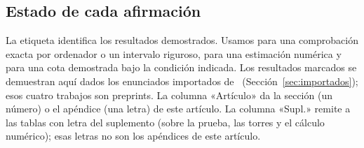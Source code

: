 \subsection{Estado de cada afirmación}\label{sec:claim-ledger}
La etiqueta  identifica los resultados demostrados.
Usamos  para una comprobación exacta por ordenador o un intervalo riguroso,
 para una estimación numérica y  para una cota demostrada bajo la
condición indicada. Los resultados marcados  se demuestran aquí dados los
enunciados importados de~\cite{pv,ef,pc,tc} (Sección~\ref{sec:importados}); esos cuatro trabajos
son preprints. La columna «Artículo» da la sección (un número) o el apéndice (una letra) de este
artículo. La columna «Supl.» remite a las tablas con letra del suplemento (sobre la prueba, las
torres y el cálculo numérico); esas letras no son los apéndices de este artículo.

